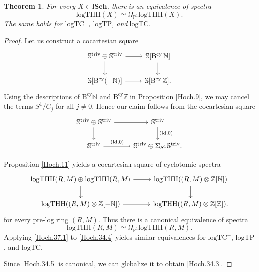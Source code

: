 \documentclass[11pt, a4paper]{amsart}
\newtheorem{thm}{Theorem}[subsection]
\theoremstyle{definition}
\numberwithin{equation}{subsection}
\newcommand{\N}{\mathbb{N}}
\newcommand{\Z}{\mathbb{Z}}
\renewcommand{\P}{\mathbb{P}}
\newcommand{\lSch}{\mathbf{lSch}}
\newcommand{\id}{\operatorname{id}}   			%
\newcommand{\Bcy}{\operatorname{B^{cy}}}
\newcommand{\Sphere}{\mathbb{S}}
\newcommand{\logTHH}{\mathrm{logTHH}}
\newcommand{\logTC}{\mathrm{logTC}}
\newcommand{\logTP}{\mathrm{logTP}}
\newcommand{\Striv}{\mathbb{S}^{\mathrm{triv}}}
\begin{document}
\begin{thm}
\label{Hoch.34}
For every $X\in \lSch$, there is an equivalence of spectra
\begin{equation}
\label{Hoch.34.3}
\logTHH(X)
\simeq
\Omega_{\P^1}\logTHH(X).
\end{equation}
The same holds for $\logTC^-$, $\logTP$, and $\logTC$.
\end{thm}
\begin{proof}
Let us construct a cocartesian square
\begin{equation}
\begin{tikzcd}
\Striv\oplus \Striv\ar[d]\ar[r]&
\Sphere[\Bcy \N]\ar[d]
\\
\Sphere[\Bcy (-\N)]\ar[r]&
\Sphere[\Bcy \Z].
\end{tikzcd}
\end{equation}
Using the descriptions of $\Bcy \N$ and $\Bcy \Z$ in Proposition \ref{Hoch.9}, 
we may cancel the terms $S^1/C_j$ for all $j\neq 0$.
Hence our claim follows from the cocartesian square
\begin{equation}
\label{Hoch.34.1}
\begin{tikzcd}
\Striv \oplus \Striv\ar[d]\ar[r]&
\Striv\ar[d,"{(\id,0)}"]\\
\Striv\ar[r,"{(\id,0)}"]&
\Striv \oplus \Sigma_{S^1} \Striv.
\end{tikzcd}
\end{equation}

Proposition \ref{Hoch.11} yields a cocartesian square of cyclotomic spectra
\begin{equation}
\label{Hoch.34.4}
\begin{tikzcd}
\logTHH(R,M)\oplus \logTHH(R,M)\ar[d]\ar[r]&
\logTHH((R,M)\otimes \Z[\N])\ar[d]
\\
\logTHH((R,M)\otimes \Z[-\N])\ar[r]&
\logTHH((R,M)\otimes \Z[\Z]).
\end{tikzcd}
\end{equation}
for every pre-log ring $(R,M)$.
Thus there is a canonical equivalence of spectra
\begin{equation}
\label{Hoch.34.5}
\logTHH(R,M)
\simeq
\Omega_{\P^1} \logTHH(R,M).
\end{equation}
Applying \eqref{Hoch.37.1} to \eqref{Hoch.34.4} yields similar equivalences for $\logTC^-$, $\logTP$, and $\logTC$.

Since \eqref{Hoch.34.5} is canonical, we can globalize it to obtain \eqref{Hoch.34.3}.
\end{proof}
\end{document}
